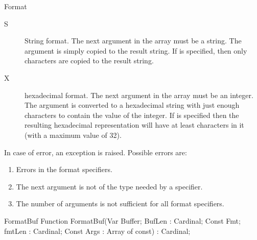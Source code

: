 \begin{function}{Format}
\begin{description}
\item[S] String format. The next argument in the  array must be
a string. The argument is simply copied to the result string. If
 is specified, then only  characters are
copied to the result string.

\item[X] hexadecimal format. The next argument in the  array must
be an integer. The argument is converted to a hexadecimal string with just
enough characters to contain the value of the integer. If 
is specified then the resulting hexadecimal representation will have at
least  characters in it (with a maximum value of 32).
\end{description}
\Errors
In case of error, an  exception is raised. Possible
errors are:
\begin{enumerate}
\item Errors in the format specifiers.
\item The next argument is not of the type needed by a specifier.
\item The number of arguments is not sufficient for all format specifiers.
\end{enumerate}
\SeeAlso
{}
\end{function}



\begin{function}{FormatBuf}
\Declaration
Function FormatBuf(Var Buffer; BufLen : Cardinal; Const Fmt; fmtLen : Cardinal; Const Args : Array of const) : Cardinal;
\Description
{}
\Errors
\SeeAlso
\end{function}


